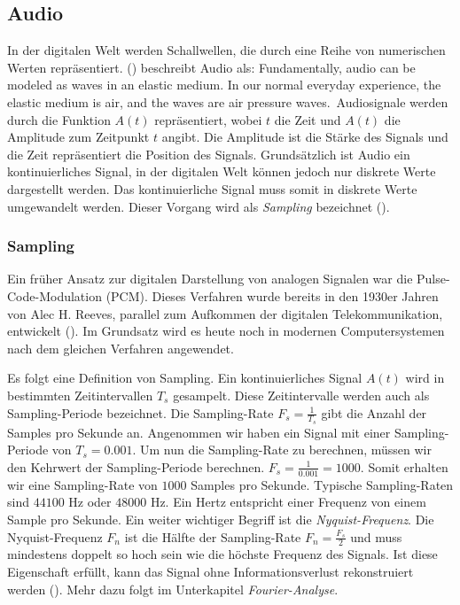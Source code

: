 \documentclass[11pt,a4paper]{article}
\begin{document}
\subsection{Audio}
In der digitalen Welt werden Schallwellen, die durch eine Reihe von numerischen Werten
repräsentiert. (\cite[p.9]{somberg2019audioapi}) beschreibt Audio als: \glqq Fundamentally,
audio can be modeled as waves in an elastic medium. In our normal everyday experience, the elastic
medium is air, and the waves are air pressure waves.\grqq \ Audiosignale werden durch die Funktion
\(A(t)\) repräsentiert, wobei \(t\) die Zeit und \(A(t)\) die Amplitude zum
Zeitpunkt \(t\) angibt. Die Amplitude ist die Stärke des Signals und die Zeit repräsentiert die
Position des Signals. Grundsätzlich ist Audio ein kontinuierliches Signal, in der digitalen Welt 
können jedoch nur diskrete Werte dargestellt werden. Das kontinuierliche Signal muss somit in 
diskrete Werte umgewandelt werden. Dieser Vorgang wird als \textit{Sampling} bezeichnet 
(\cite[Chapter~3.1]{tarr2018hackaudio}). 


\subsubsection{Sampling}
Ein früher Ansatz zur digitalen Darstellung von analogen Signalen war die Pulse-Code-Modulation
(PCM). Dieses Verfahren wurde bereits in den 1930er Jahren von Alec H. Reeves, parallel zum 
Aufkommen der digitalen Telekommunikation, entwickelt (\cite[p.~57]{deloraine1965pcm}). Im Grundsatz 
wird es heute noch in modernen Computersystemen nach dem gleichen Verfahren angewendet.

\noindent \newline
Es folgt eine Definition von Sampling. Ein kontinuierliches Signal \(A(t)\)
wird in bestimmten Zeitintervallen \(T_s\) gesampelt. Diese Zeitintervalle werden auch als
Sampling-Periode bezeichnet. Die Sampling-Rate \(F_s = \displaystyle\frac{1}{T_s}\) gibt die Anzahl
der Samples pro Sekunde an. Angenommen wir haben ein Signal mit einer Sampling-Periode
von \(T_s = 0.001\). Um nun die Sampling-Rate zu berechnen, müssen wir den Kehrwert der
Sampling-Periode berechnen. \(F_s = \displaystyle\frac{1}{0.001} = 1000\). Somit erhalten wir eine
Sampling-Rate von \(1000\) Samples pro Sekunde. Typische Sampling-Raten sind \(44100\) Hz
oder \(48000\) Hz. Ein Hertz entspricht einer Frequenz von einem Sample pro Sekunde. 
Ein weiter wichtiger Begriff ist die \textit{Nyquist-Frequenz}. Die Nyquist-Frequenz \(F_n\) ist 
die Hälfte der Sampling-Rate \(F_n = \displaystyle\frac{F_s}{2}\) und muss mindestens doppelt so 
hoch sein wie die höchste Frequenz des Signals. Ist diese Eigenschaft erfüllt, kann das 
Signal ohne Informationsverlust rekonstruiert werden (\cite[Chapter~3.1]{tarr2018hackaudio}). 
Mehr dazu folgt im Unterkapitel \textit{Fourier-Analyse}.
\end{document}
